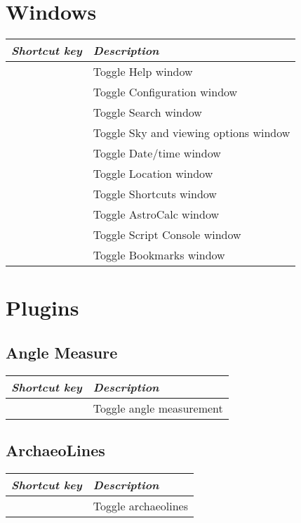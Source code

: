 \section{Windows}
\label{ch:Hotkeys:Windows}
\begin{longtabu}to \textwidth {rl} 
\toprule
\emph{Shortcut key}	& \emph{Description}\\\midrule
{}			& Toggle Help window \\
			& Toggle Configuration window \\
			& Toggle Search window \\
			& Toggle Sky and viewing options window \\
			& Toggle Date/time window \\
			& Toggle Location window \\
			& Toggle Shortcuts window \\
			& Toggle AstroCalc window\\
			& Toggle Script Console window \\
			& Toggle Bookmarks window \\
\bottomrule
\end{longtabu}

\section{Plugins}
\label{ch:Hotkeys:Plugins}

\subsection{Angle Measure}
\label{ch:Hotkeys:Plugins:AngleMeasure}
\begin{longtabu}to \textwidth {rl} 
\toprule
\emph{Shortcut key}	& \emph{Description}\\\midrule
{}		& Toggle angle measurement \\
\bottomrule
\end{longtabu}

\subsection{ArchaeoLines}
\label{ch:Hotkeys:Plugins:ArchaeoLines}
\begin{longtabu}to \textwidth {rl} 
\toprule
\emph{Shortcut key}	& \emph{Description}\\\midrule
{}		& Toggle archaeolines \\
\bottomrule
\end{longtabu}

